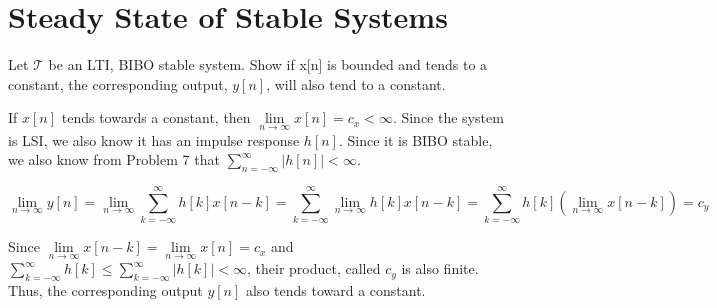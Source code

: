 \documentclass[11pt]{article}
\begin{document}
\section{Steady State of Stable Systems}
Let $\mathcal{T}$ be an LTI, BIBO stable system. Show if x[n] is bounded and tends to a constant, the corresponding output, $y[n]$, will also tend to a constant.

{\color{blue}
If $x[n]$ tends towards a constant, then $\lim\limits_{n\rightarrow \infty} x[n] = c_x < \infty$. Since the system is LSI, we also know it has an impulse response $h[n]$. Since it is BIBO stable, we also know from Problem 7 that $\sum\limits_{n=-\infty}^\infty \big| h[n]\big| < \infty$.

\[
\lim\limits_{n\rightarrow \infty} y[n] = \lim\limits_{n\rightarrow \infty} \sum\limits_{k=-\infty}^\infty h[k]x[n-k] = \sum\limits_{k=-\infty}^\infty  \lim\limits_{n\rightarrow \infty} h[k]x[n-k] = \sum\limits_{k=-\infty}^\infty h[k] \left( \lim\limits_{n\rightarrow \infty} x[n-k] \right) =c_y
\]

Since $\lim\limits_{n\rightarrow \infty} x[n-k] = \lim\limits_{n\rightarrow \infty} x[n] = c_x$ and $\sum\limits_{k=-\infty}^\infty h[k] \leq \sum\limits_{k=-\infty}^\infty |h[k]| < \infty$, their product, called $c_y$ is also finite. Thus, the corresponding output $y[n]$ also tends toward a constant.
}
\end{document}
